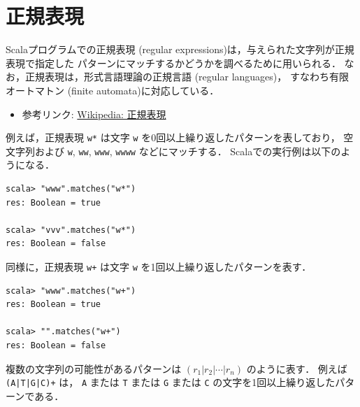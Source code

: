 \documentclass[a4j]{jsarticle}
\begin{document}

\section{正規表現}
\label{sec-2}

Scalaプログラムでの正規表現 (regular expressions)は，与えられた文字列が正規表現で指定した
パターンにマッチするかどうかを調べるために用いられる．
なお，正規表現は，形式言語理論の正規言語 (regular languages)，
すなわち有限オートマトン (finite automata)に対応している．

\begin{itemize}
\item 参考リンク: \href{https://ja.wikipedia.org/wiki/%E6%AD%A3%E8%A6%8F%E8%A1%A8%E7%8F%BE}{Wikipedia: 正規表現}
\end{itemize}

例えば，正規表現 \texttt{w*} は文字 \texttt{w} を0回以上繰り返したパターンを表しており，
空文字列および \texttt{w}, \texttt{ww}, \texttt{www}, \texttt{wwww} などにマッチする．
Scalaでの実行例は以下のようになる．

\begin{verbatim}
scala> "www".matches("w*")
res: Boolean = true

scala> "vvv".matches("w*")
res: Boolean = false
\end{verbatim}

同様に，正規表現 \texttt{w+} は文字 \texttt{w} を1回以上繰り返したパターンを表す．

\begin{verbatim}
scala> "www".matches("w+")
res: Boolean = true

scala> "".matches("w+")
res: Boolean = false
\end{verbatim}

複数の文字列の可能性があるパターンは $(r_1|r_2|\cdots|r_n)$ のように表す．
例えば \texttt{(A|T|G|C)+} は， \texttt{A} または \texttt{T} または \texttt{G} または \texttt{C} の文字を1回以上繰り返したパターンである．
\end{document}
